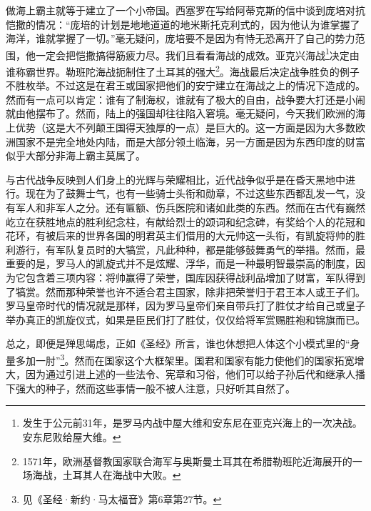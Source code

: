 \par 做海上霸主就等于建立了一个小帝国。西塞罗在写给阿蒂克斯的信中谈到庞培对抗恺撒的情况：“庞培的计划是地地道道的地米斯托克利式的，因为他认为谁掌握了海洋，谁就掌握了一切。”毫无疑问，庞培要不是因为有恃无恐离开了自己的势力范围，他一定会把恺撒搞得筋疲力尽。我们且看看海战的成效。亚克兴海战\footnote{发生于公元前31年，是罗马内战中屋大维和安东尼在亚克兴海上的一次决战。安东尼败给屋大维。}决定由谁称霸世界。勒班陀海战扼制住了土耳其的强大\footnote{1571年，欧洲基督教国家联合海军与奥斯曼土耳其在希腊勒班陀近海展开的一场海战，土耳其人在海战中大败。}。海战最后决定战争胜负的例子不胜枚举。不过这是在君王或国家把他们的安宁建立在海战之上的情况下造成的。然而有一点可以肯定：谁有了制海权，谁就有了极大的自由，战争要大打还是小闹就由他摆布了。然而，陆上的强国却往往陷入窘境。毫无疑问，今天我们欧洲的海上优势（这是大不列颠王国得天独厚的一点）是巨大的。这一方面是因为大多数欧洲国家不是完全地处内陆，而是大部分领土临海，另一方面是因为东西印度的财富似乎大部分非海上霸主莫属了。
\par 与古代战争反映到人们身上的光辉与荣耀相比，近代战争似乎是在昏天黑地中进行。现在为了鼓舞士气，也有一些骑士头衔和勋章，不过这些东西都乱发一气，没有军人和非军人之分。还有匾额、伤兵医院和诸如此类的东西。然而在古代有巍然屹立在获胜地点的胜利纪念柱，有献给烈士的颂词和纪念碑，有奖给个人的花冠和花环，有被后来的世界各国的明君英主们借用的大元帅这一头衔，有凯旋将帅的胜利游行，有军队复员时的大犒赏，凡此种种，都是能够鼓舞勇气的举措。然而，最重要的是，罗马人的凯旋式并不是炫耀、浮华，而是一种最明智最崇高的制度，因为它包含着三项内容：将帅赢得了荣誉，国库因获得战利品增加了财富，军队得到了犒赏。然而那种荣誉也许不适合君主国家，除非把荣誉归于君王本人或王子们。罗马皇帝时代的情况就是那样，因为罗马皇帝们亲自带兵打了胜仗才给自己或皇子举办真正的凯旋仪式，如果是臣民们打了胜仗，仅仅给将军赏赐胜袍和锦旗而已。
\par 总之，即便是殚思竭虑，正如《圣经》所言，谁也休想把人体这个小模式里的“身量多加一肘”\footnote{见《圣经·新约·马太福音》第6章第27节。}。然而在国家这个大框架里。国君和国家有能力使他们的国家拓宽增大，因为通过引进上述的一些法令、宪章和习俗，他们可以给子孙后代和继承人播下强大的种子，然而这些事情一般不被人注意，只好听其自然了。





